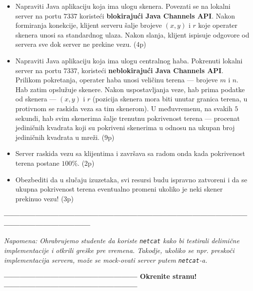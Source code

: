 \documentclass[]{article}
\begin{document}
\begin{enumerate}
\begin{itemize}
  \item Napraviti Java aplikaciju koja ima ulogu skenera. Povezati se na lokalni server na portu $7337$ koristeći \textbf{blokiraju\'c{}i Java Channels API}. Nakon formiranja konekcije, klijent serveru \v{s}alje brojeve $(x,y)$ i $r$ koje operater skenera unosi sa standardnog ulaza. Nakon slanja, klijent ispisuje odgovore od servera sve dok server ne prekine vezu. \hfill (4p)
  \item Napraviti Java aplikaciju koja ima ulogu centralnog haba. Pokrenuti lokalni server na portu $7337$, koriste\'c{}i \textbf{neblokiraju\'c{}i Java Channels API}. Prilikom pokretanja, operater haba unosi veli\v{c}inu terena --- brojeve $m$ i $n$. Hab zatim opslu\v{z}uje skenere. Nakon uspostavljanja veze, hab prima podatke od skenera --- $(x,y)$ i $r$ (pozicija skenera mora biti unutar granica terena, u protivnom se raskida veza sa tim skenerom). U međuvremenu, na svakih $5$ sekundi, hab svim skenerima \v{s}alje trenutnu pokrivenost terena --- procenat jedini\v{c}nih kvadrata koji su pokriveni skenerima u odnosu na ukupan broj jedini\v{c}nih kvadrata u mre\v{z}i. \hfill (9p)
  \item Server raskida vezu sa klijentima i zavr\v{s}ava sa radom onda kada pokrivenost terena postane $100\%$. \hfill (2p)
  \item Obezbediti da u slučaju izuzetaka, svi resursi budu ispravno zatvoreni i da se ukupna pokrivenost terena eventualno promeni ukoliko je neki skener prekinuo vezu! \hfill (3p)
\end{itemize}

\vspace{5pt}
\begin{center}
  \textbf{------------------------------------------------------------------------------------------------------------------------------}
\end{center}
\textit{Napomena: Ohrabrujemo studente da koriste \texttt{netcat} kako bi testirali delimi\v{c}ne implementacije i otkrili gre\v{s}ke pre vremena. Takodje, ukoliko se npr. presko\v{c}i implementacija servera, mo\v{z}e se mock-ovati server putem \texttt{netcat}-a.} 
\begin{center}
  \textbf{--------------------------------------------------- Okrenite stranu! ---------------------------------------------------}
\end{center}
\newpage


\end{enumerate}
\end{document}
